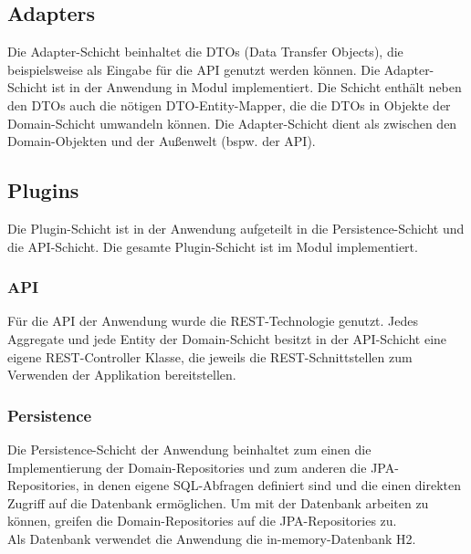 \subsection{Adapters}
Die Adapter-Schicht beinhaltet die DTOs (Data Transfer Objects), die beispielsweise als Eingabe für die API genutzt werden können. Die Adapter-Schicht ist in der Anwendung in Modul  implementiert. Die Schicht enthält neben den DTOs auch die nötigen DTO-Entity-Mapper, die die DTOs in Objekte der Domain-Schicht umwandeln können. Die Adapter-Schicht dient als  zwischen den Domain-Objekten und der Außenwelt (bspw. der API).

\subsection{Plugins}
Die Plugin-Schicht ist in der Anwendung aufgeteilt in die Persistence-Schicht und die API-Schicht. Die gesamte Plugin-Schicht ist im Modul  implementiert.
\subsubsection*{API}
Für die API der Anwendung wurde die REST-Technologie genutzt. Jedes Aggregate und jede Entity der Domain-Schicht besitzt in der API-Schicht eine eigene REST-Controller Klasse, die jeweils die REST-Schnittstellen zum Verwenden der Applikation bereitstellen. 
\subsubsection*{Persistence}
Die Persistence-Schicht der Anwendung beinhaltet zum einen die Implementierung der Domain-Repositories und zum anderen die JPA-Repositories, in denen eigene SQL-Abfragen definiert sind und die einen direkten Zugriff auf die Datenbank ermöglichen. Um mit der Datenbank arbeiten zu können, greifen die Domain-Repositories auf die JPA-Repositories zu. \\
Als Datenbank verwendet die Anwendung die in-memory-Datenbank H2.